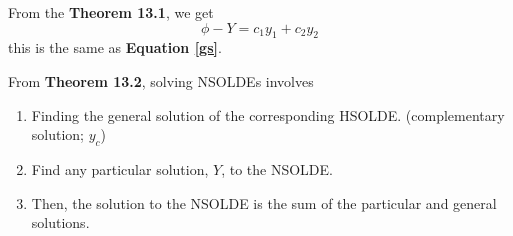 \documentclass[twoside]{report}
\begin{document}
    \begin{bproof}
        From the \textbf{Theorem 13.1}, we get
        \begin{equation}
            \phi - Y = c_{1}y_{1} + c_{2}y_{2}
        \end{equation}
        this is the same as \textbf{Equation \ref{gs}}.
    \end{bproof}
    From \textbf{Theorem  13.2}, solving NSOLDEs involves
    \begin{enumerate}
        \item Finding the general solution of the corresponding HSOLDE. (complementary solution; $y_c$)
        \item Find any particular solution, $Y$, to the NSOLDE.
        \item Then, the solution to the NSOLDE is the sum of the particular and general solutions.
    \end{enumerate}
    \np
\end{document}
